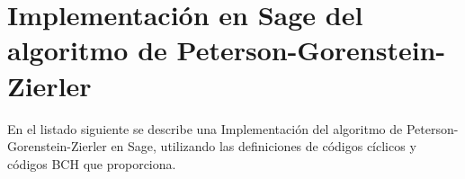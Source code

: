 \chapter[Implementación en Sage del algoritmo PGZ]{Implementación en Sage del algoritmo de Peterson-Gorenstein-Zierler}

En el listado siguiente se describe una Implementación del algoritmo de Peterson-Gorenstein-Zierler en Sage, utilizando las definiciones de códigos cíclicos y códigos BCH que proporciona.

